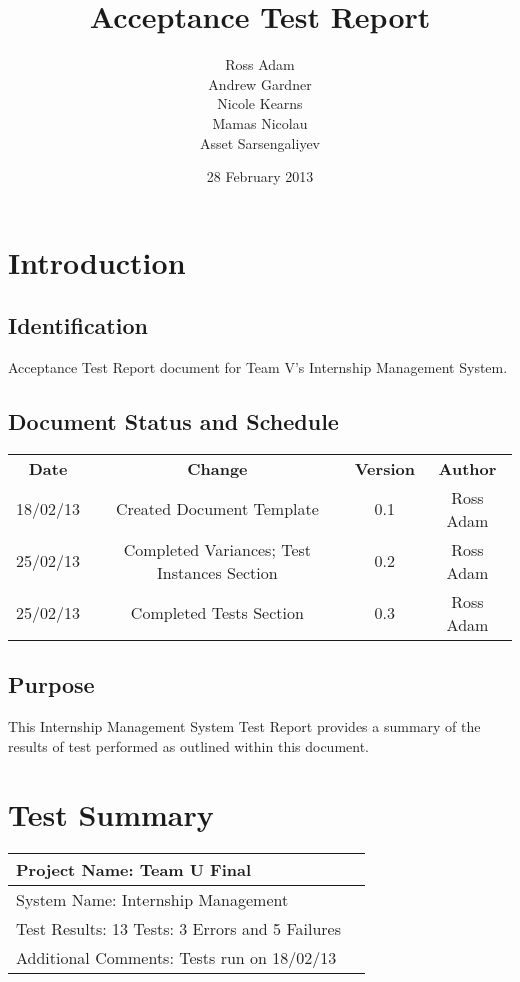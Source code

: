 \documentclass{l3deliverable}
\title{Acceptance Test Report}
\author{
  Ross Adam \\
  Andrew Gardner \\
  Nicole Kearns \\
  Mamas Nicolau \\
  Asset Sarsengaliyev \\
  }
\date{28 February 2013}
\begin{document}
\maketitle
\tableofcontents
\newpage
\section{Introduction}
\subsection{Identification}
Acceptance Test Report document for Team V's Internship Management System.
\subsection{Document Status and Schedule}
\begin{center}{
\begin{tabular}{|c|c|c|c|}
\hline \textbf{Date} &\textbf{Change} & \textbf{Version} & \textbf{Author}\\ 
18/02/13 & Created Document Template & 0.1 & Ross Adam\\
25/02/13 & Completed Variances; Test Instances Section & 0.2 & Ross Adam\\
25/02/13 & Completed Tests Section & 0.3 & Ross Adam\\
\hline 
\end{tabular} }
\end{center}

\subsection{Purpose}
This Internship Management System Test Report provides a summary of the results of test performed as outlined within this document.

\section{Test Summary}

\begin{tabular}{|l|l|}
\hline
Project Name: Team U Final & \\
\hline
System Name: Internship Management &\\
\hline
Test Results: 13 Tests: 3 Errors and 5 Failures &\\
\hline
Additional Comments: Tests run on 18/02/13 &\\
\hline
\end{tabular}
\end{document}
